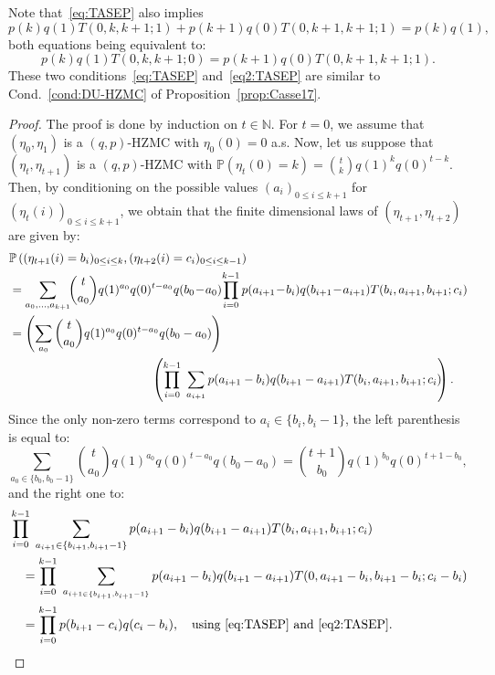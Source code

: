 \documentclass[AHL,Unicode,longabstracts]{cedram}
\newcounter{a}
\newcommand{\Cond}{Cond.}
\newcommand{\NN}{\mathbb{N}}
\newcommand{\Pbb}{\mathbb{P}}
\begin{document}
Note that~\eqref{eq:TASEP} also implies
\begin{equation}\label{eq2:TASEP}
p(k) q(1) T(0,k,k+1;1) + p(k+1) q(0) T(0,k+1,k+1;1) = p(k)q(1),
\end{equation}
both equations being equivalent to:
\begin{equation}\label{eqequiv:TASEP}
p(k) q(1) T(0,k,k+1;0) = p(k+1) q(0) T(0,k+1,k+1;1).
\end{equation}
These two conditions~\eqref{eq:TASEP} and~\eqref{eq2:TASEP} are similar to \Cond~\ref{cond:DU-HZMC} of Proposition~\ref{prop:Casse17}.

\begin{proof}
The proof is done by induction on $t\in\NN$. For $t=0$, we assume that $(\eta_0,\eta_1)$ is a $(q,p)$-HZMC with $\eta_0(0)=0$ a.s.
Now, let us suppose that $(\eta_t,\eta_{t+1})$ is a $(q,p)$-HZMC with $ \Pbb\left(\eta_t(0) = k\right) = \binom{t}{k} q(1)^k q(0)^{t-k}$. Then, by conditioning on the possible values $(a_i)_{0 \leq i \leq k+1}$ for $(\eta_t(i))_{0 \leq i \leq k+1}$, we obtain that the finite dimensional laws of $(\eta_{t+1},\eta_{t+2})$ are given by:
\begin{align*}
& \Pbb\left((\eta_{t+1}(i)=b_i)_{0 \leq i \leq k},(\eta_{t+2}(i)=c_i)_{0 \leq i \leq k-1}\right)\\
&= \sum_{a_0,\dots,a_{k+1}}\!\!\binom{t}{a_0} q(1)^{a_0} q(0)^{t-a_0} q(b_0\!-\!a_0)\!\prod_{i=0}^{k-1} p(a_{i+1}\!-\!b_i) q(b_{i+1}\!-\!a_{i+1}) T(b_i,a_{i+1},b_{i+1};c_i) \\
&= \left(\sum_{a_0 } \binom{t}{a_0} q(1)^{a_0} q(0)^{t-a_0} q(b_0-a_0)\right) \\
&\mkern 210mu \left(\prod_{i=0}^{k-1} \; \sum_{a_{i+1} } p(a_{i+1}-b_i) q(b_{i+1}-a_{i+1}) T(b_i,a_{i+1},b_{i+1};c_i)\!\!\right).
\end{align*}
Since the only non-zero terms correspond to $a_i\in\{b_i,b_i-1\}$, the left parenthesis is equal to:
\[
\sum_{a_0\in\{b_0,b_0-1\}} \binom{t}{a_0} q(1)^{a_0} q(0)^{t-a_0} q(b_0-a_0)=\binom{t+1}{b_0} q(1)^{b_0} q(0)^{t+1-b_0},
\]
and the right one to:
\begin{align*}
&\prod_{i=0}^{k-1} \; \sum_{a_{i+1}\in\{b_{i+1},b_{i+1}-1\}} p(a_{i+1}-b_i) q(b_{i+1}-a_{i+1}) T(b_i,a_{i+1},b_{i+1};c_i)\\
&\quad=\prod_{i=0}^{k-1} \; \sum_{a_{i+1\in\{b_{i+1},b_{i+1}-1\}}} p(a_{i+1}-b_i) q(b_{i+1}-a_{i+1}) T(0,a_{i+1}-b_i,b_{i+1}-b_i;c_i-b_i) \\
&\quad=\prod_{i=0}^{k-1} p(b_{i+1}-c_i) q(c_i-b_i), \quad \text{using~\eqref{eq:TASEP} and~\eqref{eq2:TASEP}}.\qedhere
\end{align*}
\end{proof}
\end{document}
